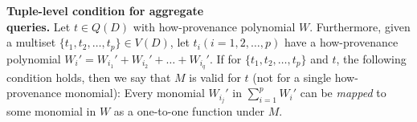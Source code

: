 \begin{definition}\label{Def: validity condition agg}
{\bf Tuple-level condition for aggregate \\queries.}
Let $t \in Q(D)$ with how-provenance polynomial $W$.
Furthermore, given a multiset $\{t_1, t_2,\dots, t_p\} \in V(D)$, let $t_i (i=1,2,\dots,p)$ have a how-provenance polynomial $W_i'=W_{i_1}' + W_{i_2}' + \dots + W_{i_q}'$.
If for $\{t_1, t_2,\dots, t_p\}$ and $t$, the following condition holds, then we say that $M$ is valid for $t$ (not for a single how-provenance monomial):
Every monomial $W_{i_j}'$ in $\sum_{i=1}^pW_i'$ can be {\em mapped} to some monomial in $W$ %
as a one-to-one function under $M$.


\end{definition}

